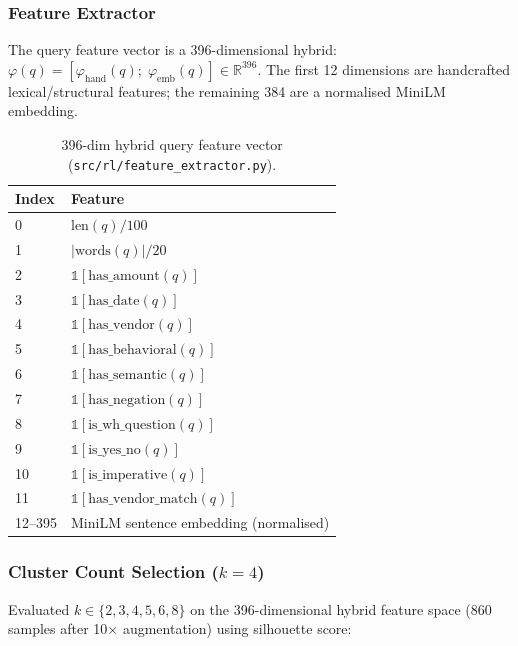 \documentclass[11pt,letterpaper]{article}
\begin{document}
\subsubsection{Feature Extractor}

The query feature vector is a 396-dimensional hybrid: $\varphi(q) = [\varphi_{\text{hand}}(q);\; \varphi_{\text{emb}}(q)] \in \mathbb{R}^{396}$. The first 12 dimensions are handcrafted lexical/structural features; the remaining 384 are a normalised MiniLM embedding.

\begin{table}[H]
\centering
\small
\begin{tabular}{ll}
\toprule
\textbf{Index} & \textbf{Feature} \\
\midrule
0 & $\text{len}(q)/100$ \\
1 & $|\text{words}(q)|/20$ \\
2 & $\mathbb{1}[\text{has\_amount}(q)]$ \\
3 & $\mathbb{1}[\text{has\_date}(q)]$ \\
4 & $\mathbb{1}[\text{has\_vendor}(q)]$ \\
5 & $\mathbb{1}[\text{has\_behavioral}(q)]$ \\
6 & $\mathbb{1}[\text{has\_semantic}(q)]$ \\
7 & $\mathbb{1}[\text{has\_negation}(q)]$ \\
8 & $\mathbb{1}[\text{is\_wh\_question}(q)]$ \\
9 & $\mathbb{1}[\text{is\_yes\_no}(q)]$ \\
10 & $\mathbb{1}[\text{is\_imperative}(q)]$ \\
11 & $\mathbb{1}[\text{has\_vendor\_match}(q)]$ \\
12--395 & MiniLM sentence embedding (normalised) \\
\bottomrule
\end{tabular}
\caption{396-dim hybrid query feature vector (\texttt{src/rl/feature\_extractor.py}).}
\label{tab:features}
\end{table}

\subsubsection{Cluster Count Selection ($k=4$)}

Evaluated $k \in \{2,3,4,5,6,8\}$ on the 396-dimensional hybrid feature space (860 samples after 10$\times$ augmentation) using silhouette score:
\end{document}
